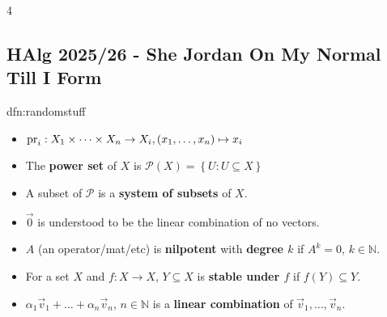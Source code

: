 \documentclass[landscape, 8pt]{extarticle}
\begin{document}
	
	\fontsize{5pt}{6pt} \selectfont
	
	\setlength\tabcolsep{4.5pt}
	\setlength\extrarowheight{2pt}
	
	\setlength{\abovedisplayskip}{0pt}
	\setlength{\belowdisplayskip}{0pt}
	\setlength{\abovedisplayshortskip}{0pt}
	\setlength{\belowdisplayshortskip}{0pt}
	
	\begin{multicols*}{4}
		\raggedcolumns 
		\vspace{-5pt}
		\subsection*{HAlg 2025/26 - She Jordan On My Normal Till I Form}
		\vspace{-5pt}
		
		
		
		\begin{dfn}{dfn:randomstuff}{ }
			\begin{itemize}
				\item $\operatorname{pr}_i : X_1 \times \dots \times X_n \to X_i, (x_1, \dots, x_n) \mapsto x_i$
				\item The \textbf{power set} of $X$ is $\mathcal{P}(X) = \left\{U: U\subseteq X\right\}$ 
				\item A subset of $\mathcal{P}$ is a \textbf{system of subsets} of $X$.
				\item $\vec{0}$ is understood to be the linear combination of no vectors.
				\item $A$ (an operator/mat/etc) is \textbf{nilpotent} with \textbf{degree $k$} if $A^k = 0$, $k\in \mathbb{N}$.
				\item For a set $X$ and $f: X \to X$, $Y \subseteq X$ is \textbf{stable under $f$} if $f(Y) \subseteq Y$.
				\item $\alpha_1\vec{v}_1 + \dots + \alpha_n \vec{v}_n$, $n\in \mathbb{N}$ is a \textbf{linear combination} of $\vec{v}_1, \dots, \vec{v}_n$.
			\end{itemize}
			
		\end{dfn}
		

\end{multicols*}
\end{document}
